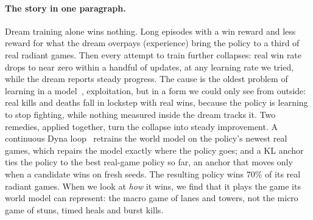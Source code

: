 \documentclass[11pt]{article}
\begin{document}
\paragraph{The story in one paragraph.} Dream training alone wins nothing. Long episodes with a win reward and less reward for what the dream overpays (experience) bring the policy to a third of real radiant games. Then every attempt to train further collapses: real win rate drops to near zero within a handful of updates, at any learning rate we tried, while the dream reports steady progress. The cause is the oldest problem of learning in a model~\cite{ha2018worldmodels}, exploitation, but in a form we could only see from outside: real kills and deaths fall in lockstep with real wins, because the policy is learning to stop fighting, while nothing measured inside the dream tracks it. Two remedies, applied together, turn the collapse into steady improvement. A continuous Dyna loop~\cite{sutton1991dyna} retrains the world model on the policy's newest real games, which repairs the model exactly where the policy goes; and a KL anchor ties the policy to the best real-game policy so far, an anchor that moves only when a candidate wins on fresh seeds. The resulting policy wins 70\% of its real radiant games. When we look at \emph{how} it wins, we find that it plays the game its world model can represent: the macro game of lanes and towers, not the micro game of stuns, timed heals and burst kills.
\end{document}
